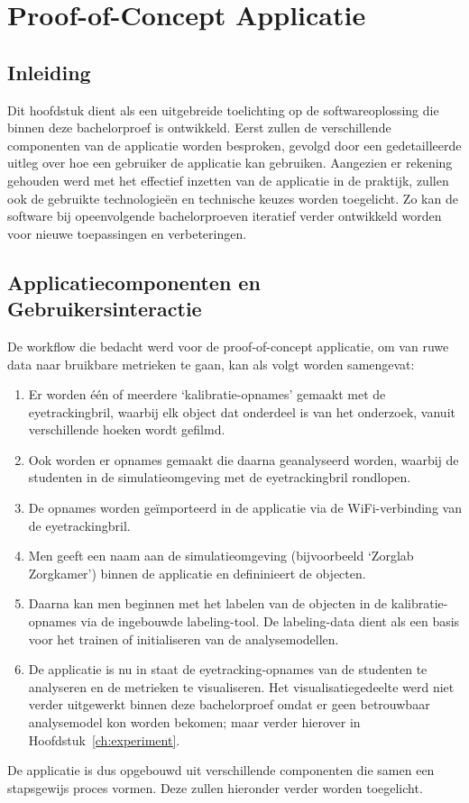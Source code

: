 \chapter{Proof-of-Concept Applicatie}
\label{ch:ontwikkeling}

\section{Inleiding}

Dit hoofdstuk dient als een uitgebreide toelichting op de softwareoplossing die binnen deze bachelorproef is ontwikkeld.
Eerst zullen de verschillende componenten van de applicatie worden besproken, gevolgd door een gedetailleerde uitleg over hoe een gebruiker de applicatie kan gebruiken.
Aangezien er rekening gehouden werd met het effectief inzetten van de applicatie in de praktijk, zullen ook de gebruikte technologieën en technische keuzes worden toegelicht.
Zo kan de software bij opeenvolgende bachelorproeven iteratief verder ontwikkeld worden voor nieuwe toepassingen en verbeteringen.

\section{Applicatiecomponenten en Gebruikersinteractie}

De workflow die bedacht werd voor de proof-of-concept applicatie, om van ruwe data naar bruikbare metrieken te gaan, kan als volgt worden samengevat:
\begin{enumerate}
    \item Er worden één of meerdere `kalibratie-opnames' gemaakt met de eyetrackingbril, waarbij elk object dat onderdeel is van het onderzoek, vanuit verschillende hoeken wordt gefilmd.
    \item Ook worden er opnames gemaakt die daarna geanalyseerd worden, waarbij de studenten in de simulatieomgeving met de eyetrackingbril rondlopen.
    \item De opnames worden geïmporteerd in de applicatie via de WiFi-verbinding van de eyetrackingbril.
    \item Men geeft een naam aan de simulatieomgeving (bijvoorbeeld `Zorglab Zorgkamer') binnen de applicatie en defininieert de objecten.
    \item Daarna kan men beginnen met het labelen van de objecten in de kalibratie-opnames via de ingebouwde labeling-tool. De labeling-data dient als een basis voor het trainen of initialiseren van de analysemodellen.
    \item De applicatie is nu in staat de eyetracking-opnames van de studenten te analyseren en de metrieken te visualiseren. Het visualisatiegedeelte werd niet verder uitgewerkt binnen deze bachelorproef omdat er geen betrouwbaar analysemodel kon worden bekomen; maar verder hierover in Hoofdstuk~\ref{ch:experiment}.
\end{enumerate}
De applicatie is dus opgebouwd uit verschillende componenten die samen een stapsgewijs proces vormen. Deze zullen hieronder verder worden toegelicht.

